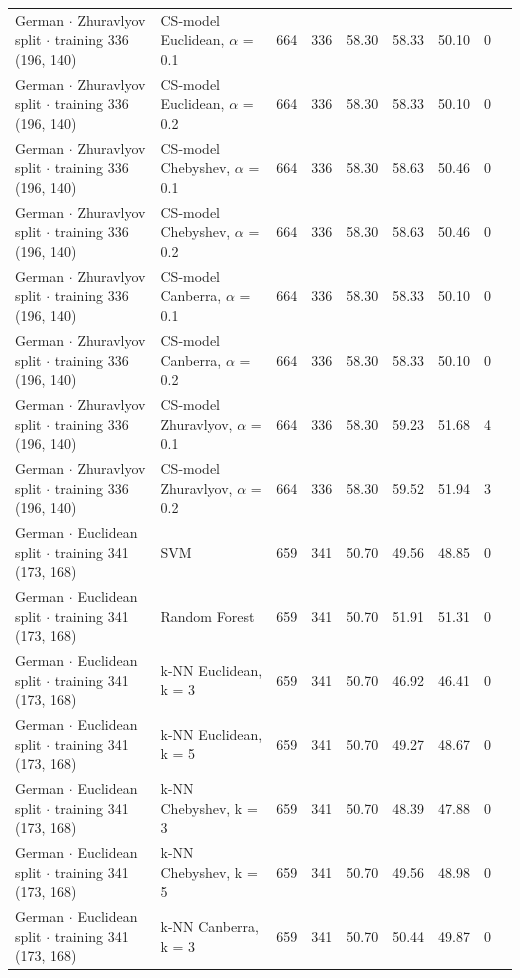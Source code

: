 \begin{longtable}{llrrrrrrl}
  German $\cdot$ Zhuravlyov split $\cdot$ training 336 (196, 140) & CS-model Euclidean, $\alpha$ = 0.1 & 664 & 336 & 58.30 & 58.33 & 50.10 & 0 &  \\
  German $\cdot$ Zhuravlyov split $\cdot$ training 336 (196, 140) & CS-model Euclidean, $\alpha$ = 0.2 & 664 & 336 & 58.30 & 58.33 & 50.10 & 0 &  \\
  German $\cdot$ Zhuravlyov split $\cdot$ training 336 (196, 140) & CS-model Chebyshev, $\alpha$ = 0.1 & 664 & 336 & 58.30 & 58.63 & 50.46 & 0 &  \\
  German $\cdot$ Zhuravlyov split $\cdot$ training 336 (196, 140) & CS-model Chebyshev, $\alpha$ = 0.2 & 664 & 336 & 58.30 & 58.63 & 50.46 & 0 &  \\
  German $\cdot$ Zhuravlyov split $\cdot$ training 336 (196, 140) & CS-model Canberra, $\alpha$ = 0.1 & 664 & 336 & 58.30 & 58.33 & 50.10 & 0 &  \\
  German $\cdot$ Zhuravlyov split $\cdot$ training 336 (196, 140) & CS-model Canberra, $\alpha$ = 0.2 & 664 & 336 & 58.30 & 58.33 & 50.10 & 0 &  \\
  German $\cdot$ Zhuravlyov split $\cdot$ training 336 (196, 140) & CS-model Zhuravlyov, $\alpha$ = 0.1 & 664 & 336 & 58.30 & 59.23 & 51.68 & 4 &  \\
  German $\cdot$ Zhuravlyov split $\cdot$ training 336 (196, 140) & CS-model Zhuravlyov, $\alpha$ = 0.2 & 664 & 336 & 58.30 & 59.52 & 51.94 & 3 &  \\
  German $\cdot$ Euclidean split $\cdot$ training 341 (173, 168) & SVM & 659 & 341 & 50.70 & 49.56 & 48.85 & 0 &  \\
  German $\cdot$ Euclidean split $\cdot$ training 341 (173, 168) & Random Forest & 659 & 341 & 50.70 & 51.91 & 51.31 & 0 &  \\
  German $\cdot$ Euclidean split $\cdot$ training 341 (173, 168) & k-NN Euclidean, k = 3 & 659 & 341 & 50.70 & 46.92 & 46.41 & 0 &  \\
  German $\cdot$ Euclidean split $\cdot$ training 341 (173, 168) & k-NN Euclidean, k = 5 & 659 & 341 & 50.70 & 49.27 & 48.67 & 0 &  \\
  German $\cdot$ Euclidean split $\cdot$ training 341 (173, 168) & k-NN Chebyshev, k = 3 & 659 & 341 & 50.70 & 48.39 & 47.88 & 0 &  \\
  German $\cdot$ Euclidean split $\cdot$ training 341 (173, 168) & k-NN Chebyshev, k = 5 & 659 & 341 & 50.70 & 49.56 & 48.98 & 0 &  \\
  German $\cdot$ Euclidean split $\cdot$ training 341 (173, 168) & k-NN Canberra, k = 3 & 659 & 341 & 50.70 & 50.44 & 49.87 & 0 &  \\

\end{longtable}
